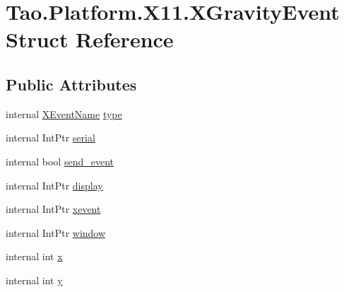 \hypertarget{struct_tao_1_1_platform_1_1_x11_1_1_x_gravity_event}{
\section{Tao.Platform.X11.XGravityEvent Struct Reference}
\label{struct_tao_1_1_platform_1_1_x11_1_1_x_gravity_event}
}
\subsection*{Public Attributes}
\begin{DoxyCompactItemize}
\item 
internal \hyperlink{namespace_tao_1_1_platform_1_1_x11_aff81ed5b8778e1ea8e872861dff9f146}{XEventName} \hyperlink{struct_tao_1_1_platform_1_1_x11_1_1_x_gravity_event_aaede875bd58bcf943a1383d06ad64e41}{type}
\item 
internal IntPtr \hyperlink{struct_tao_1_1_platform_1_1_x11_1_1_x_gravity_event_aa9199775107e57e7b79e8f68f18573df}{serial}
\item 
internal bool \hyperlink{struct_tao_1_1_platform_1_1_x11_1_1_x_gravity_event_aa832e1e784606dd4eedb1fd96b241c6d}{send\_\-event}
\item 
internal IntPtr \hyperlink{struct_tao_1_1_platform_1_1_x11_1_1_x_gravity_event_a18999e1f2c8e2eef34cd6cdea57f6981}{display}
\item 
internal IntPtr \hyperlink{struct_tao_1_1_platform_1_1_x11_1_1_x_gravity_event_a7168a6de7a724393e045ea0adad555e5}{xevent}
\item 
internal IntPtr \hyperlink{struct_tao_1_1_platform_1_1_x11_1_1_x_gravity_event_abaf631865a39cc611d5e9f28a4cade9b}{window}
\item 
internal int \hyperlink{struct_tao_1_1_platform_1_1_x11_1_1_x_gravity_event_a4e8db0bfc794fdb68079df19d47542cb}{x}
\item 
internal int \hyperlink{struct_tao_1_1_platform_1_1_x11_1_1_x_gravity_event_aaa3b8da7591937a8da079a89fcb56bab}{y}
\end{DoxyCompactItemize}


